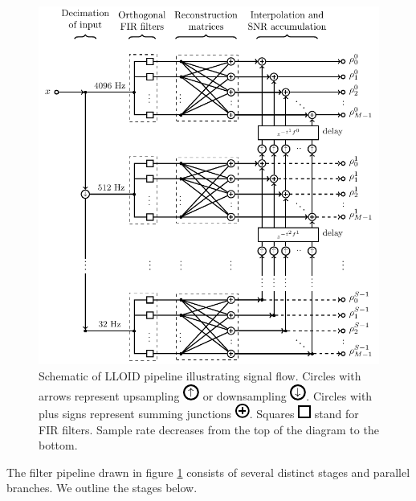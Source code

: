 \begin{figure}[htbp]
	\includegraphics{figures/lloid-diagram.pdf}
	\caption{\label{fig:pipeline} Schematic of LLOID pipeline illustrating
signal flow.  Circles with arrows represent upsampling
\protect\includegraphics{figures/upsample-symbol.pdf} or downsampling
\protect\includegraphics{figures/downsample-symbol.pdf}.  Circles with plus
signs represent summing junctions
\protect\includegraphics{figures/adder-symbol.pdf}.  Squares
\protect\includegraphics{figures/fir-symbol.pdf} stand for FIR filters.  Sample
rate decreases from the top of the diagram to the bottom.}
\end{figure}

The filter pipeline drawn in figure \ref{fig:pipeline} consists of several
distinct stages and parallel branches.  We outline the stages below. 

